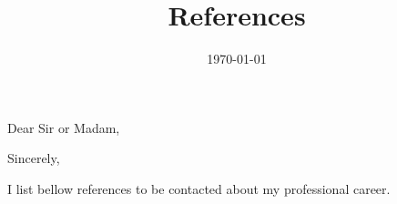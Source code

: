 \documentclass[10pt,a4paper,sans,colorlinks]{moderncv}
\title{References}
\begin{document}
\hfHyperrefSetupBlueLinks

\recipient{\ }{}
\opening{Dear Sir or Madam,}
\date{\today}
\closing{Sincerely,}

\makelettertitle

I list bellow references to be contacted about my professional career.



\makeletterclosing
\end{document}
